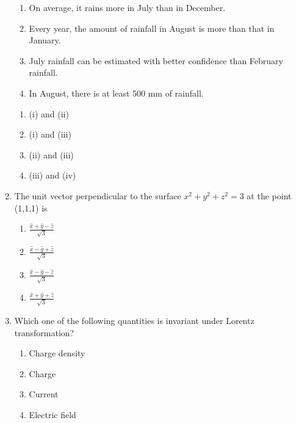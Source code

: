 \documentclass[journal,12pt,onecolumn]{IEEEtran}
\theoremstyle{remark}
\begin{document}
\begin{enumerate}
\begin{center}
\end{center}



\begin{enumerate}
    \item On average, it rains more in July than in December.
    \item Every year, the amount of rainfall in August is more than that in January.
    \item July rainfall can be estimated with better confidence than February rainfall.
    \item In August, there is at least 500 mm of rainfall.
\end{enumerate}

\begin{enumerate}
    \item (i) and (ii)
    \item (i) and (iii)
    \item (ii) and (iii)
    \item (iii) and (iv)
\end{enumerate}
 \item The unit vector perpendicular to the surface $x^2 + y^2 + z^2 = 3$ at the point (1,1,1) is
        \begin{enumerate}
            \item $\frac{\hat{x} + \hat{y} - \hat{z}}{\sqrt{3}}$
            \item $\frac{\hat{x} - \hat{y} + \hat{z}}{\sqrt{3}}$
            \item $\frac{\hat{x} - \hat{y} - \hat{z}}{\sqrt{3}}$
            \item $\frac{\hat{x} + \hat{y} + \hat{z}}{\sqrt{3}}$
        \end{enumerate}

    \item Which one of the following quantities is invariant under Lorentz transformation?
        \begin{enumerate}
            \item Charge density
            \item Charge
            \item Current
            \item Electric field
        \end{enumerate}


\end{enumerate}
\end{document}
